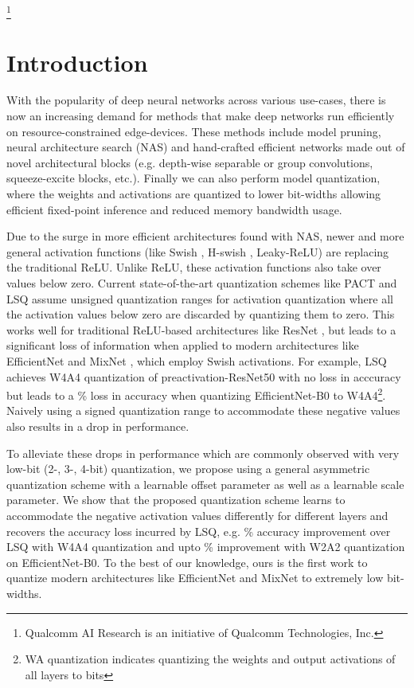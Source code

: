 \documentclass[10pt,twocolumn,letterpaper]{article}
\newcommand\blfootnote[1]{\begingroup
  \renewcommand\thefootnote{}\footnote{#1}\addtocounter{footnote}{-1}\endgroup
}
\begin{document}
\blfootnote{Qualcomm AI Research is an initiative of Qualcomm Technologies, Inc.}


\section{Introduction}
With the popularity of deep neural networks across various use-cases, there is now an increasing demand for methods that make deep networks run efficiently on resource-constrained edge-devices. These methods include model pruning, neural architecture search (NAS) and hand-crafted efficient networks made out of novel architectural blocks (e.g. depth-wise separable or group convolutions, squeeze-excite blocks, etc.). Finally we can also perform model quantization, where the weights and activations are quantized to lower bit-widths allowing efficient fixed-point inference and reduced memory bandwidth usage. 

Due to the surge in more efficient architectures found with NAS, newer and more general activation functions (like Swish \cite{swish}, H-swish \cite{mobilenetv3}, Leaky-ReLU) are replacing the traditional ReLU. Unlike ReLU, these activation functions also take over values below zero. Current state-of-the-art quantization schemes like PACT \cite{pact2018} and LSQ \cite{lsq} assume unsigned quantization ranges for activation quantization where all the activation values below zero are discarded by quantizing them to zero. This works well for traditional ReLU-based architectures like ResNet \cite{resnet2}, but leads to a significant loss of information when applied to modern architectures like EfficientNet \cite{efficientnet} and MixNet \cite{mixnet}, which employ Swish activations. For example, LSQ achieves W4A4 quantization of preactivation-ResNet50 with no loss in acccuracy but leads to a \% loss in accuracy when quantizing EfficientNet-B0 to W4A4\footnote{WA quantization indicates quantizing the weights and output activations of all layers to  bits}. Naively using a signed quantization range to accommodate these negative values also results in a drop in performance. 

To alleviate these drops in performance which are commonly observed with very low-bit (2-, 3-, 4-bit) quantization, we propose using a general asymmetric quantization scheme with a learnable offset parameter as well as a learnable scale parameter. We show that the proposed quantization scheme learns to accommodate the negative activation values differently for different layers and recovers the accuracy loss incurred by LSQ, e.g. \% accuracy improvement over LSQ with W4A4 quantization and upto \% improvement with W2A2 quantization on EfficientNet-B0. To the best of our knowledge, ours is the first work to quantize modern architectures like EfficientNet and MixNet to extremely low bit-widths.
\end{document}
